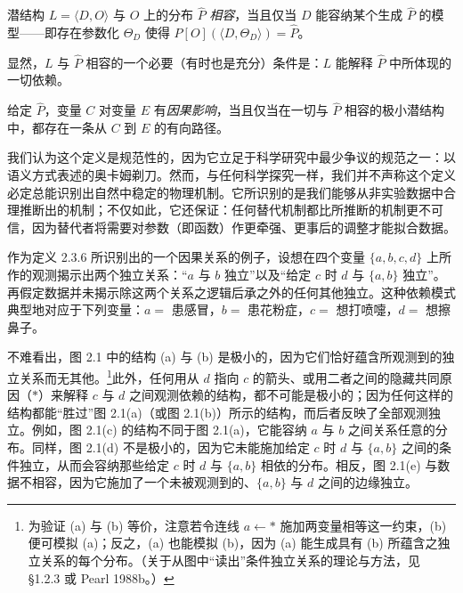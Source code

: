 \begin{definition}[相容性]
潜结构 $L=\langle D,O\rangle$ 与 $O$ 上的分布 $\hat{P}$ \emph{相容}，当且仅当 $D$ 能容纳某个生成 $\hat{P}$ 的模型——即存在参数化 $\Theta_D$ 使得 $P[O](\langle D,\Theta_D\rangle)=\hat{P}$。
\end{definition}

显然，$L$ 与 $\hat{P}$ 相容的一个必要（有时也是充分）条件是：$L$ 能解释 $\hat{P}$ 中所体现的一切依赖。

\begin{definition}[推断因果性]
给定 $\hat{P}$，变量 $C$ 对变量 $E$ 有\emph{因果影响}，当且仅当在一切与 $\hat{P}$ 相容的极小潜结构中，都存在一条从 $C$ 到 $E$ 的有向路径。
\end{definition}

我们认为这个定义是规范性的，因为它立足于科学研究中最少争议的规范之一：以语义方式表述的奥卡姆剃刀。然而，与任何科学探究一样，我们并不声称这个定义必定总能识别出自然中稳定的物理机制。它所识别的是我们能够从非实验数据中合理推断出的机制；不仅如此，它还保证：任何替代机制都比所推断的机制更不可信，因为替代者将需要对参数（即函数）作更牵强、更事后的调整才能拟合数据。

作为定义 2.3.6 所识别出的一个因果关系的例子，设想在四个变量 $\{a,b,c,d\}$ 上所作的观测揭示出两个独立关系：“$a$ 与 $b$ 独立”以及“给定 $c$ 时 $d$ 与 $\{a,b\}$ 独立”。再假定数据并未揭示除这两个关系之逻辑后承之外的任何其他独立。这种依赖模式典型地对应于下列变量：$a=$ 患感冒，$b=$ 患花粉症，$c=$ 想打喷嚏，$d=$ 想擦鼻子。

不难看出，图 2.1 中的结构 (a) 与 (b) 是极小的，因为它们恰好蕴含所观测到的独立关系而无其他。\footnote{为验证 (a) 与 (b) 等价，注意若令连线 $a\leftarrow *$ 施加两变量相等这一约束，(b) 便可模拟 (a)；反之，(a) 也能模拟 (b)，因为 (a) 能生成具有 (b) 所蕴含之独立关系的每个分布。（关于从图中“读出”条件独立关系的理论与方法，见 \S 1.2.3 或 Pearl 1988b。）}此外，任何用从 $d$ 指向 $c$ 的箭头、或用二者之间的隐藏共同原因（$*$）来解释 $c$ 与 $d$ 之间观测依赖的结构，都不可能是极小的；因为任何这样的结构都能“胜过”图 2.1(a)（或图 2.1(b)）所示的结构，而后者反映了全部观测独立。例如，图 2.1(c) 的结构不同于图 2.1(a)，它能容纳 $a$ 与 $b$ 之间关系任意的分布。同样，图 2.1(d) 不是极小的，因为它未能施加给定 $c$ 时 $d$ 与 $\{a,b\}$ 之间的条件独立，从而会容纳那些给定 $c$ 时 $d$ 与 $\{a,b\}$ 相依的分布。相反，图 2.1(e) 与数据不相容，因为它施加了一个未被观测到的、$\{a,b\}$ 与 $d$ 之间的边缘独立。


